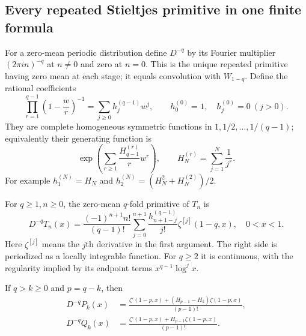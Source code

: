 \subsection{Every repeated Stieltjes primitive in one finite formula}

For a zero-mean periodic distribution define $D^{-q}$ by its Fourier
multiplier $(2\pi i n)^{-q}$ at $n\ne0$ and zero at $n=0$. This is
the unique repeated primitive having zero mean at each stage; it equals
convolution with $W_{1-q}$. Define the rational coefficients
\begin{equation}\label{per:eq:h}
 \prod_{r=1}^{q-1}\left(1-\frac wr\right)^{-1}
       =\sum_{j\ge0}h_j^{(q-1)}w^j,
 \qquad h_0^{(0)}=1,\quad h_j^{(0)}=0\ (j>0).
\end{equation}
They are complete homogeneous symmetric functions in
$1,1/2,\ldots,1/(q-1)$; equivalently their generating function is
\[
 \exp\left(\sum_{r\ge1}\frac{H_{q-1}^{(r)}}r w^r\right),
 \qquad H_N^{(r)}=\sum_{j=1}^N\frac1{j^r}.
\]
For example $h_1^{(N)}=H_N$ and
$h_2^{(N)}=(H_N^2+H_N^{(2)})/2$.

\begin{theorem}
\label{per:thm:primitive}
For $q\ge1,n\ge0$, the zero-mean $q$-fold primitive of $T_n$ is
\begin{equation}\label{per:eq:primitive}
 D^{-q}T_n(x)=\frac{(-1)^{n+1}n!}{(q-1)!}
 \sum_{j=0}^{n+1}\frac{h_{n+1-j}^{(q-1)}}{j!}
                              \zeta^{[j]}(1-q,x),\quad 0<x<1.
\end{equation}
Here $\zeta^{[j]}$ means the $j$th derivative in the first argument.
The right side is periodized as a locally integrable function. For
$q\ge2$ it is continuous, with the regularity implied by its endpoint
terms $x^{q-1}\log^j x$.

If $q>k\ge0$ and $p=q-k$, then
\begin{align}
 D^{-q}P_k(x)&=
 \frac{\zeta'(1-p,x)+(H_{p-1}-H_k)\zeta(1-p,x)}{(p-1)!},
 \label{per:eq:Pprimitive}\\
 D^{-q}Q_k(x)&=
 \frac{\zeta'(1-p,x)+H_{p-1}\zeta(1-p,x)}{(p-1)!}.
 \label{per:eq:Qprimitive}
\end{align}
\end{theorem}

